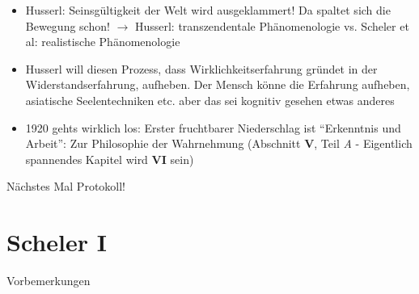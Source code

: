 \documentclass[emulatestandardclasses]{scrartcl}
\begin{document}
\begin{itemize}
  \item Husserl: Seinsgültigkeit der Welt wird ausgeklammert! Da spaltet sich die Bewegung schon! $\rightarrow$ Husserl: transzendentale Phänomenologie vs. Scheler et al: realistische Phänomenologie
  \item Husserl will diesen Prozess, dass Wirklichkeitserfahrung gründet in der Widerstandserfahrung, aufheben. Der Mensch könne die Erfahrung aufheben, asiatische Seelentechniken etc. aber das sei kognitiv gesehen etwas anderes
  \item 1920 gehts wirklich los: Erster fruchtbarer Niederschlag ist "`Erkenntnis und Arbeit"': Zur Philosophie der Wahrnehmung (Abschnitt \textbf{V}, Teil \emph{A} - Eigentlich spannendes Kapitel wird \textbf{VI} sein)
\end{itemize}

Nächstes Mal Protokoll!

\section{Scheler I}

Vorbemerkungen
\end{document}
